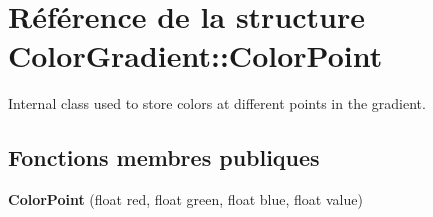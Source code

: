 \hypertarget{struct_color_gradient_1_1_color_point}{}\section{Référence de la structure Color\+Gradient\+:\+:Color\+Point}
\label{struct_color_gradient_1_1_color_point}


Internal class used to store colors at different points in the gradient.  


\subsection*{Fonctions membres publiques}
\begin{DoxyCompactItemize}
\item 
\hypertarget{struct_color_gradient_1_1_color_point_ad6a0b9d0b0320903b4b9f50cff976321}{}{\bfseries Color\+Point} (float red, float green, float blue, float value)\label{struct_color_gradient_1_1_color_point_ad6a0b9d0b0320903b4b9f50cff976321}

\end{DoxyCompactItemize}
